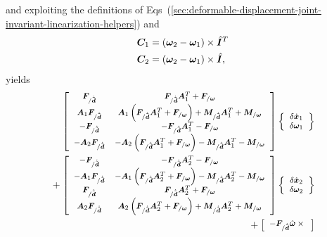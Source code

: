 \documentclass[10pt,fleqn,subeqn]{report}
\newcommand{\T}[1]{\bm{#1}}
\newcommand{\TT}[1]{\bm{#1}}
\begin{document}
and exploiting the definitions of
Eqs~(\ref{sec:deformable-displacement-joint-invariant-linearization-helpers})
and
\begin{subequations}
\begin{align}
	\TT{C}_1 &= \plbr{\T{\omega}_2 - \T{\omega}_1}\times\hat{\TT{I}}^T \\
	\TT{C}_2 &= \plbr{\T{\omega}_2 - \T{\omega}_1}\times\hat{\TT{I}}
	,
\end{align}
\end{subequations}
yields %
\begin{align}
	\footnotesize
	\sqbr{\matr{cc}{
		\T{F}_{/\dot{\tilde{\T{d}}}} 
		& \T{F}_{/\dot{\tilde{\T{d}}}} \TT{A}_1^T
			+ \T{F}_{/\T{\omega}}
		\\
%
		\TT{A}_1 \T{F}_{/\dot{\tilde{\T{d}}}} 
		& \TT{A}_1 \plbr{
			\T{F}_{/\dot{\tilde{\T{d}}}} \TT{A}_1^T
			+ \T{F}_{/\T{\omega}}
		}
			+ \T{M}_{/\dot{\tilde{\T{d}}}} \TT{A}_1^T
			+ \T{M}_{/\T{\omega}}
		\\
%
		- \T{F}_{/\dot{\tilde{\T{d}}}} 
		& - \T{F}_{/\dot{\tilde{\T{d}}}} \TT{A}_1^T
			- \T{F}_{/\T{\omega}}
		\\
%
		- \TT{A}_2 \T{F}_{/\dot{\tilde{\T{d}}}} 
		& - \TT{A}_2 \plbr{
			\T{F}_{/\dot{\tilde{\T{d}}}} \TT{A}_1^T
			+ \T{F}_{/\T{\omega}}
		}
			- \T{M}_{/\dot{\tilde{\T{d}}}} \TT{A}_1^T
			- \T{M}_{/\T{\omega}}
	}} \cubr{\cvvect{
		\delta\dot{\T{x}}_1 \\
		\delta\T{\omega}_1
	}} & \nonumber \\
	\footnotesize
	\mbox{} + \sqbr{\matr{cc}{
		- \T{F}_{/\dot{\tilde{\T{d}}}}
		& - \T{F}_{/\dot{\tilde{\T{d}}}} \TT{A}_2^T
			- \T{F}_{/\T{\omega}}
		\\
%
		- \TT{A}_1 \T{F}_{/\dot{\tilde{\T{d}}}}
		& - \TT{A}_1 \plbr{
			\T{F}_{/\dot{\tilde{\T{d}}}} \TT{A}_2^T
			+ \T{F}_{/\T{\omega}}
		}
			- \T{M}_{/\dot{\tilde{\T{d}}}} \TT{A}_2^T
			- \T{M}_{/\T{\omega}}
		\\
%
		\T{F}_{/\dot{\tilde{\T{d}}}}
		& \T{F}_{/\dot{\tilde{\T{d}}}} \TT{A}_2^T
			+ \T{F}_{/\T{\omega}}
		\\
%
		\TT{A}_2 \T{F}_{/\dot{\tilde{\T{d}}}}
		& \TT{A}_2 \plbr{
			\T{F}_{/\dot{\tilde{\T{d}}}} \TT{A}_2^T
			+ \T{F}_{/\T{\omega}}
		}
			+ \T{M}_{/\dot{\tilde{\T{d}}}} \TT{A}_2^T
			+ \T{M}_{/\T{\omega}}
	}} \cubr{\cvvect{
		\delta\dot{\T{x}}_2 \\
		\delta\T{\omega}_2
	}} & \nonumber \\
	\footnotesize
	\mbox{} + \sqbr{\matr{cc}{
		- \T{F}_{/\dot{\tilde{\T{d}}}} \hat{\T{\omega}}\times{}
}}
\end{align}
\end{document}
